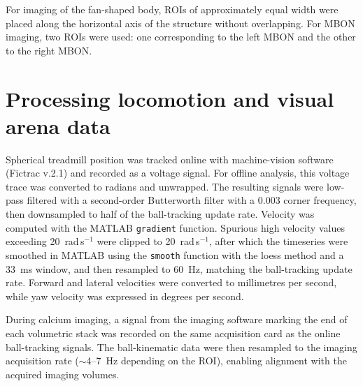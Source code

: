 For imaging of the fan-shaped body, ROIs of approximately equal width were placed along the horizontal axis of the structure without overlapping. For MBON imaging, two ROIs were used: one corresponding to the left MBON and the other to the right MBON.

\section{Processing locomotion and visual arena data}

Spherical treadmill position was tracked online with machine-vision software (Fictrac v.2.1) and recorded as a voltage signal. For offline analysis, this voltage trace was converted to radians and unwrapped. The resulting signals were low-pass filtered with a second-order Butterworth filter with a 0.003 corner frequency, then downsampled to half of the ball-tracking update rate. Velocity was computed with the MATLAB \texttt{gradient} function. Spurious high velocity values exceeding 20~rad\,s$^{-1}$ were clipped to 20~rad\,s$^{-1}$, after which the timeseries were smoothed in MATLAB using the \texttt{smooth} function with the loess method and a 33~ms window, and then resampled to 60~Hz, matching the ball-tracking update rate. Forward and lateral velocities were converted to millimetres per second, while yaw velocity was expressed in degrees per second.

During calcium imaging, a signal from the imaging software marking the end of each volumetric stack was recorded on the same acquisition card as the online ball-tracking signals. The ball-kinematic data were then resampled to the imaging acquisition rate ($\sim$4--7~Hz depending on the ROI), enabling alignment with the acquired imaging volumes.

